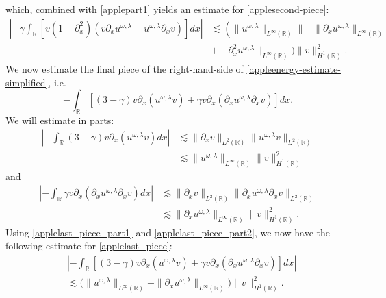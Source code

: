 \documentclass[12pt,reqno]{amsart}
\newcommand{\rr}{\mathbb{R}}
\newcommand{\p}{\partial}
\theoremstyle{plain}  %
\theoremstyle{definition}
\begin{document}
which, combined with \eqref{applepart1} yields an estimate for
\eqref{applesecond-piece}:
\begin{equation}
	\begin{split}
		\label{applesecond-piece-final}
		\left | -\gamma \int_{\rr}
		\left[ v\left( 1-\p_x^2 \right)\left( v \p_x u^{\omega,\lambda} + u^{\omega,\lambda} \p_x v
		\right) \right] dx \right |
		&\lesssim \left( \|u^{\omega,\lambda}\|_{L^\infty(\rr)}\| + \|\p_x u^{\omega,\lambda}
		\|_{L^\infty(\rr)} \right . 
		\\
		& + \|\p_x^2 u^{\omega,\lambda} \|_{L^\infty(\rr)}
		\big )\|v\|_{H^1(\rr)}^2.
	\end{split}
\end{equation}
We now estimate the final piece of the right-hand-side of
\eqref{appleenergy-estimate-simplified}, i.e.
\begin{equation}
	\label{applelast_piece}
	-\int_{\rr} \left[ \left( 3 -\gamma \right)v \p_x \left( u^{\omega,\lambda} v \right) + \gamma
	v \p_x \left( \p_x u^{\omega,\lambda} \p_x v \right)\right]dx.
\end{equation}
We will estimate in parts:
\begin{equation}
	\begin{split}
		\label{applelast_piece_part1}
		\left | -\int_{\rr}  \left( 3- \gamma \right)v \p_x\left( u^{\omega,\lambda} v \right)
		 dx \right | 
		& \lesssim \|\p_x v \|_{L^2(\rr)} \|u^{\omega,\lambda} v \|_{L^2(\rr)}
		\\
		& \lesssim \|u^{\omega,\lambda}\|_{L^\infty(\rr)} \|v\|_{H^1(\rr)}^2
	\end{split}
\end{equation}
and
\begin{equation}
	\begin{split}
		\label{applelast_piece_part2}
		\left | -\int_{\rr}  \gamma v \p_x \left( \p_x u^{\omega,\lambda} \p_x v
		\right) dx  \right | 
		& \lesssim \|\p_x v \|_{L^2(\rr)} \| \p_x u^{\omega,\lambda} \p_x v \|_{L^2(\rr)}
		\\
		& \lesssim \|\p_x u^{\omega,\lambda} \|_{L^\infty(\rr)} \|v \|_{H^1(\rr)}^2.
	\end{split}
\end{equation}
Using \eqref{applelast_piece_part1} and \eqref{applelast_piece_part2}, we now have the
following estimate for \eqref{applelast_piece}:
\begin{equation}
	\begin{split}
	\label{applelast_piece_final}
	& \left | -\int_{\rr} \left[ \left( 3-\gamma \right)v
	\p_x \left( u^{\omega,\lambda} v \right) + \gamma
	v \p_x \left( \p_x u^{\omega,\lambda} \p_x v \right)\right]dx \right |
	\\
	& \lesssim \big(
	\|u^{\omega,\lambda}\|_{L^\infty(\rr)}
	 + \|\p_x u^{\omega,\lambda} \|_{L^\infty(\rr)} \big)
	\|v\|_{H^1(\rr)}^2.
\end{split}
\end{equation}
\end{document}
